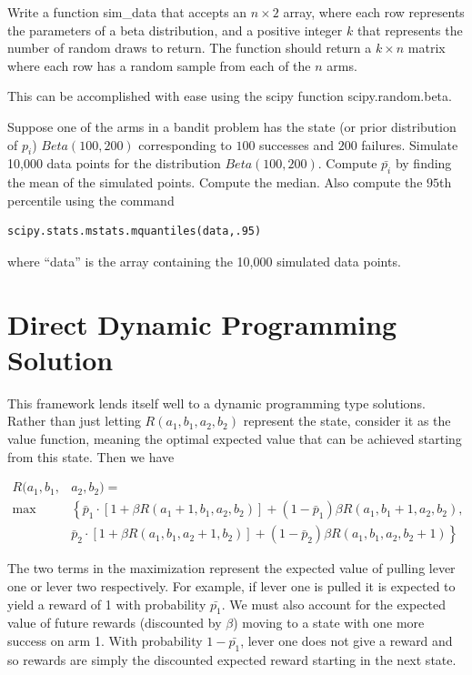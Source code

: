 \begin{problem}
Write a function sim\_data that accepts an $n\times 2$ array, where each row represents the parameters of a beta distribution, and a positive integer $k$ that represents the number of random draws to return.  The function should return a $k\times n$ matrix where each row has a random sample from each of the $n$ arms.

This can be accomplished with ease using the scipy function scipy.random.beta.
\end{problem}

\begin{problem}
Suppose one of the arms in a bandit problem has the state (or prior distribution of $p_i$) $Beta(100,200)$ corresponding to $100$ successes and $200$ failures.  Simulate 10,000 data points for the distribution $Beta(100,200)$.  Compute $\bar{p_i}$ by finding the mean of the simulated points.  Compute the median.  Also compute the $95$th percentile using the command

\begin{lstlisting}[style = python]
scipy.stats.mstats.mquantiles(data,.95)
\end{lstlisting}
where ``data'' is the array containing the 10,000 simulated data points.
\end{problem}

\section*{Direct Dynamic Programming Solution}
This framework lends itself well to a dynamic programming type solutions.  Rather than just letting $R(a_1,b_1,a_2,b_2)$ represent the state, consider it as the value function, meaning the optimal expected value that can be achieved starting from this state.  Then we have

\begin{equation}\label{recurs}
\begin{aligned}
R(a_1,b_1,&a_2,b_2) =\\
 \max&\left\{\bar{p}_1\cdot[1 + \beta R(a_1+1,b_1,a_2,b_2)] + (1-\bar{p}_1)\beta R(a_1,b_1+1,a_2,b_2)\right. ,\\
&  \left.\bar{p}_2\cdot[1 + \beta R(a_1,b_1,a_2+1,b_2)] + (1-\bar{p}_2)\beta R(a_1,b_1,a_2,b_2+1)\right\}
\end{aligned}
\end{equation}

The two terms in the maximization represent the expected value of pulling lever one or lever two respectively.  For example, if lever one is pulled it is expected to yield a reward of 1 with probability $\bar{p_1}$.  We must also account for the expected value of future rewards (discounted by $\beta$) moving to a state with one more success on arm 1.  With probability $1-\bar{p_1}$, lever one does not give a reward and so rewards are simply the discounted expected reward starting in the next state.

